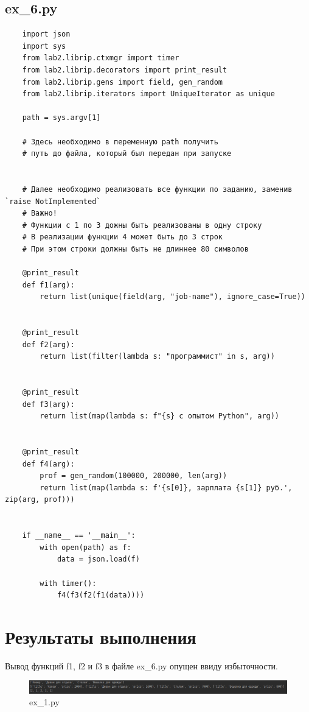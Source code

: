 \documentclass{article}
\begin{document}
\subsection{ex\_6.py}
\begin{verbatim}
    import json
    import sys
    from lab2.librip.ctxmgr import timer
    from lab2.librip.decorators import print_result
    from lab2.librip.gens import field, gen_random
    from lab2.librip.iterators import UniqueIterator as unique
    
    path = sys.argv[1]
    
    # Здесь необходимо в переменную path получить
    # путь до файла, который был передан при запуске
    
    
    # Далее необходимо реализовать все функции по заданию, заменив `raise NotImplemented`
    # Важно!
    # Функции с 1 по 3 дожны быть реализованы в одну строку
    # В реализации функции 4 может быть до 3 строк
    # При этом строки должны быть не длиннее 80 символов
    
    @print_result
    def f1(arg):
        return list(unique(field(arg, "job-name"), ignore_case=True))
    
    
    @print_result
    def f2(arg):
        return list(filter(lambda s: "программист" in s, arg))
    
    
    @print_result
    def f3(arg):
        return list(map(lambda s: f"{s} с опытом Python", arg))
    
    
    @print_result
    def f4(arg):
        prof = gen_random(100000, 200000, len(arg))
        return list(map(lambda s: f'{s[0]}, зарплата {s[1]} руб.', zip(arg, prof)))
    
    
    if __name__ == '__main__':
        with open(path) as f:
            data = json.load(f)
    
        with timer():
            f4(f3(f2(f1(data))))
\end{verbatim}
\newpage
\section{Результаты выполнения}
Вывод функций f1, f2 и f3 в файле ex\_6.py опущен ввиду избыточности.

\begin{figure}[h!]
    \centering
    \includegraphics[width=\textwidth]{ex1.png}
    \caption{ex\_1.py}
    \label{fig: ex1}
\end{figure}
\end{document}
